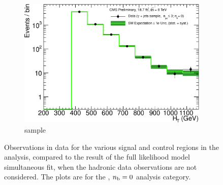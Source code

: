 \begin{figure}[h!]
\begin{subfigure}[b]{0.48\textwidth}
    \includegraphics[width=\textwidth]
    {Figs/results/v0/greenBand/single_plots/photon_0b_le3j_logy.pdf}
    \caption{\gj sample}
  \end{subfigure}
  \caption{Observations in data for the various signal and control
  regions in the analysis, compared to the result of the full likelihood model
  simultaneous fit, when the hadronic data observations are not considered. The
  plots are for the \njhigh, $n_{\text{b}} = 0$ analysis category.}
  \label{fig:green_fits_0b_ge4j}
\end{figure}


